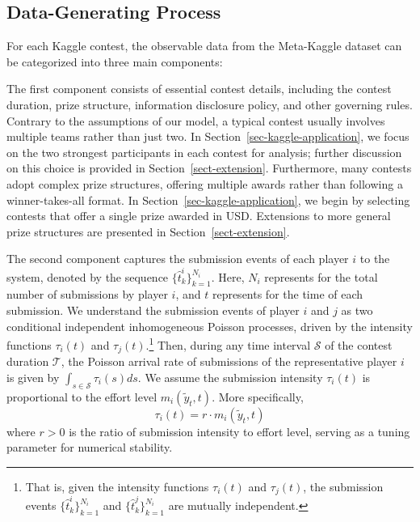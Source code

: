 \documentclass[mnsc]{informs3}
\begin{document}
\subsection{Data-Generating Process}

For each Kaggle contest, the observable data from the Meta-Kaggle dataset can be categorized into three main components:

The first component consists of essential contest details, including the contest duration, prize structure, information disclosure policy, and other governing rules.
Contrary to the assumptions of our model, a typical contest usually involves multiple teams rather than just two.
In Section~\ref{sec-kaggle-application}, we focus on the two strongest participants in each contest for analysis; further discussion on this choice is provided in Section~\ref{sect-extension}.
Furthermore, many contests adopt complex prize structures, offering multiple awards rather than following a winner-takes-all format.
In Section~\ref{sec-kaggle-application}, we begin by selecting contests that offer a single prize awarded in USD.
Extensions to more general prize structures are presented in Section~\ref{sect-extension}.

The second component captures the submission events of each player $i$ to the system, denoted by the sequence $\{\hat{t}^i_k\}_{k=1}^{N_i}$.
Here, $N_i$ represents for the total number of submissions by player $i$, and $t$ represents for the time of each submission. 
We understand the submission events of player $i$ and $j$ as two conditional independent inhomogeneous Poisson processes, driven by the intensity functions $\tau_i(t)$ and $\tau_j(t)$.\footnote{That is, given the intensity functions $\tau_i(t)$ and $\tau_j(t)$, the submission events $\{\hat{t}^i_k\}_{k=1}^{N_i}$ and $\{\hat{t}^j_k\}_{k=1}^{N_i}$ are mutually independent.}
Then, during any time interval $\mathcal{S}$ of the contest duration $\mathcal{T}$, the Poisson arrival rate of submissions of the representative player $i$ is given by $\int_{s\in\mathcal{S}}\tau_i(s)ds$. 
We assume the submission intensity $\tau_i(t)$ is proportional to the effort level $m_i(\tilde{y}_t, t)$. More specifically, 
\begin{equation}\label{eq-model-intensity}
\tau_i(t) = r \cdot m_i(\tilde{y}_t, t)
\end{equation}
where $r>0$ is the ratio of submission intensity to effort level, serving as a tuning parameter for numerical stability. 
\end{document}
